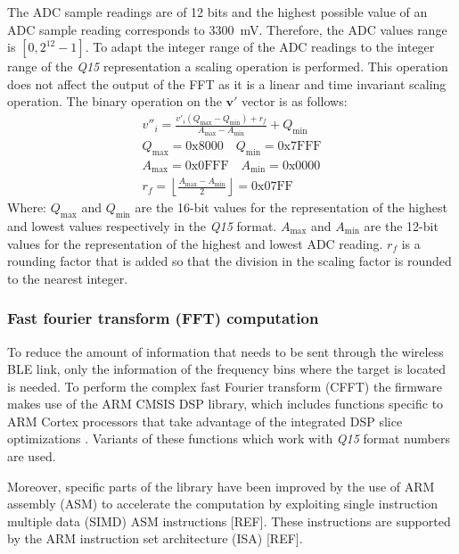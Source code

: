 The ADC sample readings are of 12 bits and the highest possible value of an ADC sample reading corresponds to \SI{3300}{\milli\volt}. Therefore, the ADC values range is $[0, 2^{12}-1]$. To adapt the integer range of the ADC readings to the integer range of the \textit{Q15} representation a scaling operation is performed. This operation does not affect the output of the FFT as it is a linear and time invariant scaling operation. The binary operation on the $\mathbf{v'}$ vector is as follows:
\begin{gather}
	v''_i = \frac{v'_i(Q_{\max}-Q_{\min})+r_f}{A_{\max}-A_{\min}} + Q_{\min}\\
	Q_{\max} = \mathrm{0x8000}\quad Q_{\min} = \mathrm{0x7FFF} \\
	A_{\max} = \mathrm{0x0FFF}\quad A_{\min} = \mathrm{0x0000} \\
	r_f = \left\lfloor \frac{A_{\max}-A_{\min}}{2} \right\rfloor = \mathrm{0x07FF}
\end{gather}
Where: $Q_{\max}$ and $Q_{\min}$ are the 16-bit values for the representation of the highest and lowest values respectively in the \textit{Q15} format. $A_{\max}$ and $A_{\min}$ are the 12-bit values for the representation of the highest and lowest ADC reading. $r_f$ is a rounding factor that is added so that the division in the scaling factor is rounded to the nearest integer.

\subsubsection{Fast fourier transform (FFT) computation}

To reduce the amount of information that needs to be sent through the wireless BLE link, only the information of the frequency bins where the target is located is needed. To perform the complex fast Fourier transform (CFFT) the firmware makes use of the ARM CMSIS DSP library, which includes functions specific to ARM Cortex processors that take advantage of the integrated DSP slice optimizations \cite{AR}. Variants of these functions which work with \textit{Q15} format numbers are used.

Moreover, specific parts of the library have been improved by the use of ARM assembly (ASM) to accelerate the computation by exploiting single instruction multiple data (SIMD) ASM instructions [REF]. These instructions are supported by the ARM instruction set architecture (ISA) [REF].

